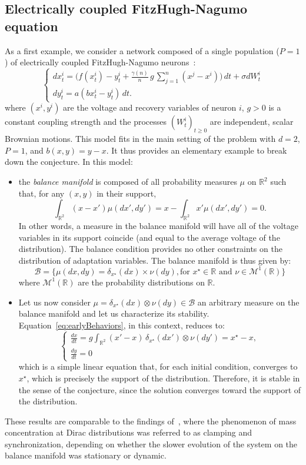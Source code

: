 \documentclass[onefignum,onetabnum]{siamart190516}
\newcommand{\R}{\mathbb{R}}
\newcommand{\1}{\mathbbm{1}}
\newcommand{\B}{\mathcal{B}}
\newcommand{\review}[1]{\textcolor{midblue}{ #1}}
\newcommand{\minor}[1]{\textcolor{orange}{ #1}}
\renewcommand{\review}[1]{{ #1}}
\renewcommand{\minor}[1]{{ #1}}
\begin{document}
\subsection{Electrically coupled FitzHugh-Nagumo equation}\label{sec:ElectricalExample}
\review{As a first example, we consider a network composed of a single population ($P=1$) of electrically coupled FitzHugh-Nagumo neurons~\cite{quininao2020clamping,mischler2015kinetic}:}
\[\begin{cases}
dx^i_t=\Big(f(x^i_t)-y^i_t+\frac{\gamma(n)}{n}\,\minor{g}\, \sum_{j=1}^n (x^j-x^i)\Big)\,dt + \sigma dW^i_t\\
dy^i_t=a(bx^i_t-y^i_t)\review{\,dt}.
\end{cases}\]
\review{where $(x^i,y^i)$ are the voltage and recovery variables of neuron $i$, $g>0$ is a constant coupling strength and the processes $(W^i_t)_{t\geq 0}$ are independent, scalar Brownian motions}. This model fits in the main setting of the problem with $d=2$, $P=1$, and $b(x,y)=y-x$. \review{It thus provides an elementary example to break down the conjecture. In this model:}
\begin{itemize}
\item \review{the \emph{balance manifold} is composed of all probability measures $\mu$ on $\R^2$ such that, for any $(x,y)$ in their support, 
\[\int_{\R^2} (x-x')\mu(\review{dx',dy'})=x-\int_{\R^2} x'\mu(\review{dx',dy'})=0.\] 
In other words, a measure in the balance manifold will have all of the voltage variables in its support coincide (and equal to the average voltage of the distribution). The balance condition provides no other constraints on the distribution of adaptation variables. The balance manifold is thus given by:
\[\B=\{\mu(\review{dx,dy})=\delta_{x^\star}(dx)\times \nu(dy), \text{for } x^{\star} \in \R \text{ and } \nu\in \mathcal{M}^1(\R)\} \]
where $ \mathcal{M}^1(\R)$ are the probability distributions on $\R$. }
\item \review{Let us now consider $\mu=\delta_{x^\star}(dx)\otimes \nu(dy)\in \B$ an arbitrary measure on the balance manifold and let us characterize its stability. } Equation~\eqref{eq:earlyBehaviors}, in this context, reduces to:
\begin{equation}
\begin{cases}
\frac{dx}{dt} = g \int_{\R^2} (x'-x)\,\delta_{x^\star}(dx')\otimes \nu(dy')= x^\star-x,\\
\frac{dy}{dt} =0
\end{cases}
\end{equation}
which is a simple linear equation that, for each initial condition, converges to $x^\star$, which is precisely the support of the distribution. Therefore, it is stable in the sense of the conjecture, since the solution converges toward the support of the distribution. 
\end{itemize}
\review{These results are comparable to the findings of~\cite{quininao2020clamping}, where the phenomenon of mass concentration at Dirac distributions was referred to as clamping and synchronization, depending on whether the slower evolution of the system on the balance manifold was stationary or dynamic. }
\end{document}
